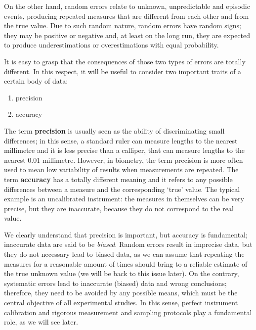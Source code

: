 \documentclass[a4paper,12pt,oneside]{book}
\providecommand{\tightlist}{%
  \setlength{\itemsep}{0pt}\setlength{\parskip}{0pt}}
\begin{document}
On the other hand, random errors relate to unknown, unpredictable and episodic events, producing repeated measures that are different from each other and from the true value. Due to such random nature, random errors have random signs; they may be positive or negative and, at least on the long run, they are expected to produce underestimations or overestimations with equal probability.

It is easy to grasp that the consequences of those two types of errors are totally different. In this respect, it will be useful to consider two important traits of a certain body of data:

\begin{enumerate}
\def\labelenumi{\arabic{enumi}.}
\tightlist
\item
  precision
\item
  accuracy
\end{enumerate}

The term \textbf{precision} is usually seen as the ability of discriminating small differences; in this sense, a standard ruler can measure lengths to the nearest millimetre and it is less precise than a calliper, that can measure lengths to the nearest 0.01 millimetre. However, in biometry, the term precision is more often used to mean low variability of results when measurements are repeated. The term \textbf{accuracy} has a totally different meaning and it refers to any possible differences between a measure and the corresponding `true' value. The typical example is an uncalibrated instrument: the measures in themselves can be very precise, but they are inaccurate, because they do not correspond to the real value.

We clearly understand that precision is important, but accuracy is fundamental; inaccurate data are said to be \emph{biased}. Random errors result in imprecise data, but they do not necessary lead to biased data, as we can assume that repeating the measures for a reasonable amount of times should bring to a reliable estimate of the true unknown value (we will be back to this issue later). On the contrary, systematic errors lead to inaccurate (biased) data and wrong conclusions; therefore, they need to be avoided by any possible means, which must be the central objective of all experimental studies. In this sense, perfect instrument calibration and rigorous measurement and sampling protocols play a fundamental role, as we will see later.
\end{document}

